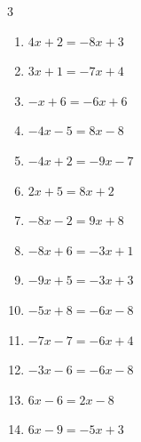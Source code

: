 \begin{multicols}{3}
\begin{enumerate}
  \item $4x+2=-8x+3$


  \item $3x+1=-7x+4$


  \item $-x+6=-6x+6$

        \phantom{$\displaystyle x=0$}

  \item $-4x-5=8x-8$


  \item $-4x+2=-9x-7$


  \item $2x+5=8x+2$


\columnbreak %

\resetques

  \item $-8x-2=9x+8$


  \item $-8x+6=-3x+1$

        \phantom{$\displaystyle x=1$}

  \item $-9x+5=-3x+3$


  \item $-5x+8=-6x-8$

        \phantom{$\displaystyle x=-16$}

  \item $-7x-7=-6x+4$

        \phantom{$\displaystyle x=-11$}

  \item $-3x-6=-6x-8$


  \item $6x-6=2x-8$


  \item $6x-9=-5x+3$


\end{enumerate}
\end{multicols}
